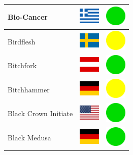 \documentclass[12pt, a4paper, twoside]{report}
\begin{document}
\begin{center}
\begin{longtable}{|p{5cm}|p{2cm}|p{2cm}|}
 Bio-Cancer                                                 & \includegraphics[width=1cm]{../img/flags/gr} &   \includegraphics[width=1cm]{../likes/y} \\ \hline
 Birdflesh                                                  & \includegraphics[width=1cm]{../img/flags/se} &   \includegraphics[width=1cm]{../likes/m} \\ \hline
 Bitchfork                                                  & \includegraphics[width=1cm]{../img/flags/at} &   \includegraphics[width=1cm]{../likes/y} \\ \hline
 Bitchhammer                                                & \includegraphics[width=1cm]{../img/flags/de} &   \includegraphics[width=1cm]{../likes/m} \\ \hline
 Black Crown Initiate                                       & \includegraphics[width=1cm]{../img/flags/us} &   \includegraphics[width=1cm]{../likes/y} \\ \hline
 Black Medusa                                               & \includegraphics[width=1cm]{../img/flags/de} &   \includegraphics[width=1cm]{../likes/y} \\ \hline

\end{longtable}
\end{center}
\end{document}

